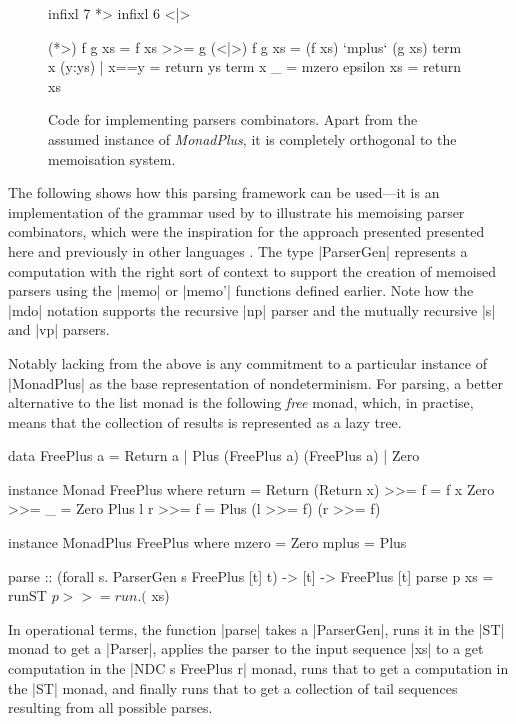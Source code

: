 \documentclass[a4paper,10pt]{article}
\begin{document}
\begin{figure}
\begin{haskell}
	infixl 7 *>
	infixl 6 <|>

	(*>)  f g xs = f xs >>= g
	(<|>) f g xs = (f xs) `mplus` (g xs)
	term x (y:ys) | x==y = return ys
	term x _ = mzero
	epsilon xs = return xs 
\end{haskell}
\caption{Code for implementing parsers combinators. Apart from the assumed
instance of \emph{MonadPlus}, it is completely orthogonal to the memoisation system. }
\end{figure}

The following shows how this parsing framework can be used---it is an implementation
of the grammar used by \cite{Johnson1995} to illustrate his memoising parser combinators,
which were the inspiration for the approach presented presented here
and previously in other languages \citep{Abdallah2017a,Abdallah2017b}.
The type |ParserGen| represents a computation with the right sort of
context to support the creation of memoised parsers using the |memo| or |memo'| functions
defined earlier.
Note how the |mdo| notation supports the recursive |np| parser and the mutually
recursive |s| and |vp| parsers.
Notably lacking from the above is any commitment to a particular instance of |MonadPlus| as
the base representation of nondeterminism. For parsing, a better alternative to the list
monad is the following \emph{free} monad, which, in practise, means that the collection of results
is represented as a lazy tree. 
\begin{haskell}
  data FreePlus a = Return a | Plus (FreePlus a) (FreePlus a) | Zero

  instance Monad FreePlus where
    return = Return
    (Return x) >>= f = f x
    Zero >>= _ = Zero
    Plus l r >>= f = Plus (l >>= f) (r >>= f)

  instance MonadPlus FreePlus where
    mzero  = Zero
    mplus  = Plus

  parse :: (forall s. ParserGen s FreePlus [t] t) -> [t] -> FreePlus [t]
  parse p xs = runST $ p >>= run . ($ xs)
\end{haskell}
In operational terms, the function |parse| takes a |ParserGen|, runs it in the |ST| monad to get
a |Parser|, applies the parser to the input sequence |xs| to a get computation
in the |NDC s FreePlus r| monad, runs that to get a computation in the |ST| monad,
and finally runs that to get a collection of tail sequences resulting from all
possible parses.
\end{document}
